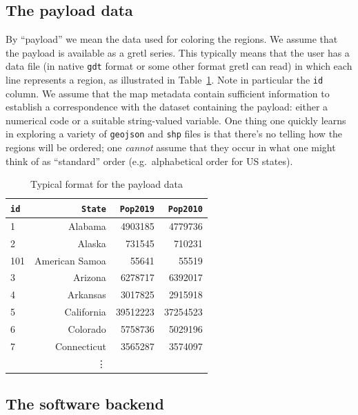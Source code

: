 \documentclass{article}
\begin{document}
\subsection{The payload data}
\label{sec:payload}

By ``payload'' we mean the data used for coloring the regions.  We
assume that the payload is available as a gretl series. This typically
means that the user has a data file (in native \texttt{gdt} format or
some other format gretl can read) in which each line represents a
region, as illustrated in Table~\ref{tab:payload}. Note in particular
the \texttt{id} column.  We assume that the map metadata contain
sufficient information to establish a correspondence with the dataset
containing the payload: either a numerical code or a suitable
string-valued variable.  One thing one quickly learns in exploring a
variety of \texttt{geojson} and \texttt{shp} files is that there's no
telling how the regions will be ordered; one \textit{cannot} assume
that they occur in what one might think of as ``standard'' order
(e.g.\ alphabetical order for US states).

\begin{table}[htbp]
\begin{center}
\begin{tabular}{lrrr}
  \hline
  \texttt{id}	& \texttt{State}& \texttt{Pop2019} & \texttt{Pop2010} \\
  \hline
  1	& Alabama	& 4903185	& 4779736  \\
  2     & Alaska	& 731545	& 710231   \\
  101   & American Samoa	& 55641	& 55519	  \\
  3	& Arizona	& 6278717	& 6392017  \\
  4	& Arkansas	& 3017825	& 2915918  \\
  5	& California	& 39512223	& 37254523 \\
  6	& Colorado	& 5758736	& 5029196  \\
  7	& Connecticut	& 3565287	& 3574097  \\
                & \vdots & \\
  \hline
\end{tabular}
\end{center}
\caption{Typical format for the payload data}
\label{tab:payload}
\end{table}


\subsection{The software backend}
\label{sec:software}
\end{document}
